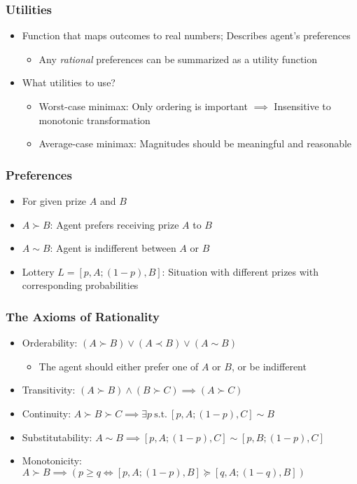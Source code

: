 \subsubsection*{Utilities}
\begin{itemize}
    \item Function that maps outcomes to real numbers; Describes agent's preferences
    \begin{itemize}
        \item Any \textit{rational} preferences can be summarized as a utility function
    \end{itemize}
    \item What utilities to use?
    \begin{itemize}
        \item Worst-case minimax: Only ordering is important $\implies$ Insensitive to monotonic transformation
        \item Average-case minimax: Magnitudes should be meaningful and reasonable
    \end{itemize}
\end{itemize}

\subsubsection*{Preferences}
\begin{itemize}
    \item For given prize $A$ and $B$
    \item $A\succ B$: Agent prefers receiving prize $A$ to $B$
    \item $A\sim B$: Agent is indifferent between $A$ or $B$
    \item Lottery $L=[p,A;(1-p),B]$: Situation with different prizes with corresponding probabilities
\end{itemize}

\subsubsection*{The Axioms of Rationality}
\begin{itemize}
    \item Orderability: $(A\succ B)\vee(A\prec B)\vee(A\sim B)$
    \begin{itemize}
        \item The agent should either prefer one of $A$ or $B$, or be indifferent
    \end{itemize}
    \item Transitivity: $(A\succ B)\wedge(B\succ C)\implies(A\succ C)$
    \item Continuity: $A\succ B\succ C\implies\exists p~\text{s.t.}~[p,A;(1-p),C]\sim B$
    \item Substitutability: $A\sim B\implies[p,A;(1-p),C]\sim[p,B;(1-p),C]$
    \item Monotonicity: $A\succ B\implies(p\geq q\iff[p,A;(1-p),B]\succeq[q,A;(1-q),B])$
\end{itemize}

